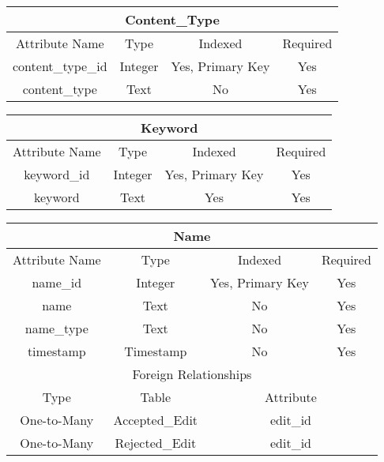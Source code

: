 \documentclass[12pt,letterpaper]{article}
\begin{document}
\vspace*{.4cm}
\begin{center}
\label{ContentType}
\begin{tabular}{|c|c|c|c|}
\hline
\multicolumn{4}{|c|}{Content\_Type} \\ \hline
Attribute Name & Type & Indexed & Required \\ \hline
content\_type\_id & Integer & Yes, Primary Key & Yes \\ \hline
content\_type & Text & No & Yes \\ \hline
\end{tabular}
\end{center}


\vspace*{.4cm}
\begin{center}
\label{Keyword}
\begin{tabular}{|c|c|c|c|}
\hline
\multicolumn{4}{|c|}{Keyword} \\ \hline
Attribute Name & Type & Indexed & Required \\ \hline
keyword\_id & Integer & Yes, Primary Key & Yes \\ \hline
keyword & Text & Yes & Yes \\ \hline
\end{tabular}
\end{center}


\begin{center}
\label{Name}
\begin{tabular}{|c|c|c|c|}
\hline
\multicolumn{4}{|c|}{Name} \\ \hline
Attribute Name & Type & Indexed & Required \\ \hline
name\_id & Integer & Yes, Primary Key & Yes \\ \hline
name & Text & No & Yes \\ \hline
name\_type & Text & No & Yes \\ \hline
timestamp & Timestamp & No & Yes \\ \hline
\multicolumn{4}{|c|}{Foreign Relationships} \\ \hline
Type & Table & \multicolumn{2}{c|}{Attribute} \\ \hline
One-to-Many & Accepted\_Edit & \multicolumn{2}{c|}{edit\_id} \\ \hline %
One-to-Many & Rejected\_Edit & \multicolumn{2}{c|}{edit\_id} \\ \hline %
\end{tabular}
\end{center}
\end{document}
